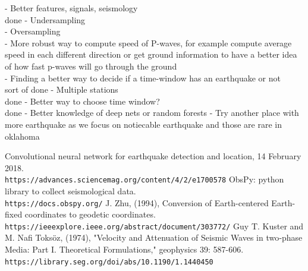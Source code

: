 \documentclass[10pt,conference,compsocconf]{IEEEtran}
\begin{document}
- Better features, signals, seismology\\ done
- Undersampling\\
- Oversampling\\
- More robust way to compute speed of P-waves, for example compute average speed in each different direction or get ground information to have a better idea of how fast p-waves will go through the ground\\
- Finding a better way to decide if a time-window has an earthquake or not\\ sort of done
- Multiple stations\\ done
- Better way to choose time window?\\ done
- Better knowledge of deep nets or random forests
- Try another place with more earthquake as we focus on notiecable earthquake and those are rare in oklahoma

\begin{thebibliography}{9}
Convolutional neural network for earthquake detection and location, 14 February 2018. \\\texttt{https://advances.sciencemag.org/content/4/2/e1700578}
ObsPy: python library to collect seismological data.
\\\texttt{https://docs.obspy.org/}
J. Zhu, (1994),  Conversion of Earth-centered Earth-fixed coordinates to geodetic coordinates. \\\texttt{https://ieeexplore.ieee.org/abstract/document/303772/}
Guy T. Kuster and M. Nafi Toksöz, (1974), "Velocity and Attenuation of Seismic Waves in two‐phase Media: Part I. Theoretical Formulations," geophysics 39: 587-606. \\\texttt{https://library.seg.org/doi/abs/10.1190/1.1440450}
\end{thebibliography}
\end{document}
